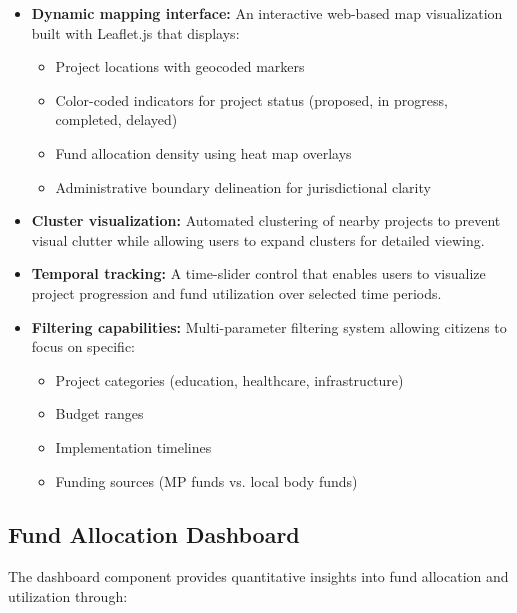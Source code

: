 \documentclass[12pt,a4paper]{report}
\begin{document}
\begin{itemize}
    \item \textbf{Dynamic mapping interface:} An interactive web-based map visualization built with Leaflet.js that displays:
    \begin{itemize}
        \item Project locations with geocoded markers
        \item Color-coded indicators for project status (proposed, in progress, completed, delayed)
        \item Fund allocation density using heat map overlays
        \item Administrative boundary delineation for jurisdictional clarity
    \end{itemize}
    
    \item \textbf{Cluster visualization:} Automated clustering of nearby projects to prevent visual clutter while allowing users to expand clusters for detailed viewing.
    
    \item \textbf{Temporal tracking:} A time-slider control that enables users to visualize project progression and fund utilization over selected time periods.
    
    \item \textbf{Filtering capabilities:} Multi-parameter filtering system allowing citizens to focus on specific:
    \begin{itemize}
        \item Project categories (education, healthcare, infrastructure)
        \item Budget ranges
        \item Implementation timelines
        \item Funding sources (MP funds vs. local body funds)
    \end{itemize}
\end{itemize}

\subsection{Fund Allocation Dashboard}
\indent \indent The dashboard component provides quantitative insights into fund allocation and utilization through:
\end{document}
